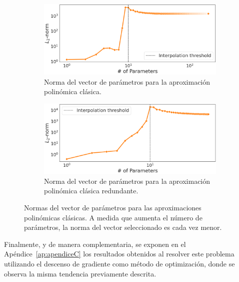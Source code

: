 \begin{figure}[h]
    \centering
    \begin{subfigure}[b]{0.48\textwidth}
        \centering
        \includegraphics[width=\textwidth]{img/experiments/OLS1.4.png}
        \caption{Norma del vector de parámetros para la aproximación polinómica clásica.}\label{fig:OLS1.4DDD}
    \end{subfigure}
    \hfill
    \begin{subfigure}[b]{0.48\textwidth}
        \centering
        \includegraphics[width=\textwidth]{img/experiments/Redundant1.4.png}
        \caption{Norma del vector de parámetros para la aproximación polinómica clásica redundante.}\label{fig:Redundant1.4DDD}
    \end{subfigure}
    \caption[Normas del vector de parámetros para las aproximaciones polinómicas clásicas.]{Normas del vector de parámetros para las aproximaciones polinómicas clásicas. A medida que aumenta el número de parámetros, la norma del vector seleccionado es cada vez menor.}\label{fig:normas-clasicas}
\end{figure}

Finalmente, y de manera complementaria, se exponen en el Apéndice~\ref{ap:apendiceC} los resultados obtenidos al resolver este problema utilizando el descenso de gradiente como método de optimización, donde se observa la misma tendencia previamente descrita.

